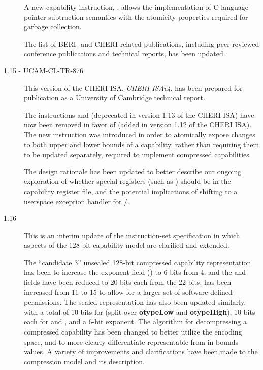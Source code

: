 \begin{description}
  A new capability instruction, , allows the implementation
  of C-language pointer subtraction semantics with the atomicity properties
  required for garbage collection.

  The list of BERI- and CHERI-related publications, including peer-reviewed
  conference publications and technical reports, has been updated.

\item[1.15 - UCAM-CL-TR-876]
  This version of the CHERI ISA, \textit{CHERI ISAv4}, has been prepared for
  publication as a University of Cambridge technical report.

  The instructions  and 
  (deprecated in version 1.13 of the CHERI ISA) have now been removed in favor
  of  (added in version 1.12 of the CHERI ISA).
  The new instruction was introduced in order to atomically expose changes to
  both upper and lower bounds of a capability, rather than requiring them to
  be updated separately, required to implement compressed capabilities.

  The design rationale has been updated to better describe our ongoing
  exploration of whether special registers (such as \KCC{}) should be in the
  capability register file, and the potential implications of shifting to a
  userspace exception handler for /.

\item[1.16] This is an interim update of the instruction-set specification in
  which aspects of the 128-bit capability model are clarified and extended.

  The ``candidate 3'' unsealed 128-bit compressed capability representation
  has been to increase the exponent field (\cexponent{}) to 6 bits from 4, and
  the \cbasebits{} and \ctopbits{} fields have been reduced to 20 bits each
  from the 22 bits.
  \cperms{} has been increased from 11 to 15 to allow for a larger set of
  software-defined permissions.
  The sealed representation has also been updated similarly, with a total of
  10 bits for \cotype{} (split over {\bf otypeLow} and {\bf otypeHigh}), 10
  bits each for \cbasebits{} and \ctopbits{}, and a 6-bit exponent.
  The algorithm for decompressing a compressed capability has been changed to
  better utilize the encoding space, and to more clearly differentiate
  representable from in-bounds values.
  A variety of improvements and clarifications have been made to the
  compression model and its description.


\end{description}
